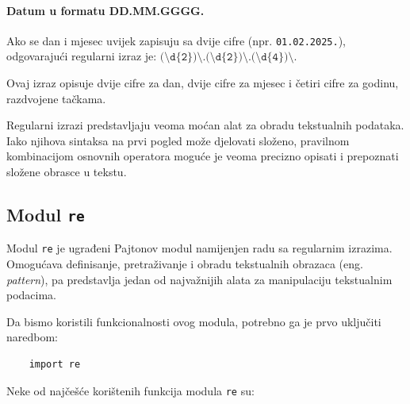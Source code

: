 \paragraph{Datum u formatu DD.MM.GGGG.}

Ako se dan i mjesec uvijek zapisuju sa dvije cifre (npr. \texttt{01.02.2025.}), odgovarajući regularni izraz je: $
\texttt{(\textbackslash d\{2\})\textbackslash.(\textbackslash d\{2\})\textbackslash.(\textbackslash d\{4\})\textbackslash.} $

Ovaj izraz opisuje dvije cifre za dan, dvije cifre za mjesec i četiri cifre za godinu, razdvojene tačkama.

\bigskip

Regularni izrazi predstavljaju veoma moćan alat za obradu tekstualnih podataka. Iako njihova sintaksa na prvi pogled može djelovati složeno, pravilnom kombinacijom osnovnih operatora moguće je veoma precizno opisati i prepoznati složene obrasce u tekstu.

\subsection{Modul \texttt{re}}

Modul \texttt{re} je ugrađeni Pajtonov modul namijenjen radu sa regularnim izrazima. Omogućava definisanje, pretraživanje i obradu tekstualnih obrazaca (eng. \textit{pattern}), pa predstavlja jedan od najvažnijih alata za manipulaciju tekstualnim podacima.

Da bismo koristili funkcionalnosti ovog modula, potrebno ga je prvo uključiti naredbom:

\begin{verbatim}
	import re
\end{verbatim}

Neke od najčešće korištenih funkcija modula \texttt{re} su:

